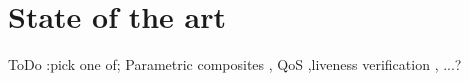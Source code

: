 \section{State of the art}
ToDo :pick one of; Parametric composites ,  QoS ,liveness verification \cite{6176626} , ...?


\newpage

